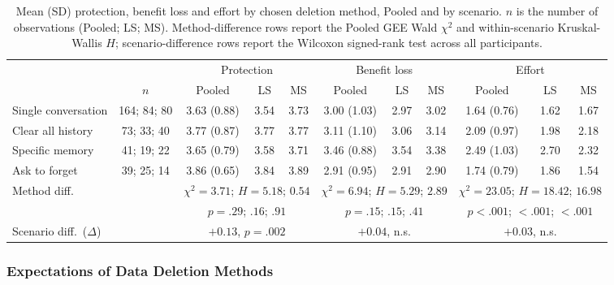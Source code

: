 \documentclass[conference,compsoc]{IEEEtran}
\begin{document}
\begin{table}[t]
\centering
\caption{Mean (SD) protection, benefit loss and effort by chosen deletion method, Pooled and by scenario. $n$ is the number of observations (Pooled; LS; MS). Method-difference rows report the Pooled GEE Wald $\chi^2$ and within-scenario Kruskal-Wallis $H$; scenario-difference rows report the Wilcoxon signed-rank test across all participants.}
\label{tab:method-scales}
\small
\setlength{\tabcolsep}{4pt}
\begin{tabular}{lcccccccccc}
\toprule
 & & \multicolumn{3}{c}{Protection} & \multicolumn{3}{c}{Benefit loss} & \multicolumn{3}{c}{Effort} \\
\cmidrule(lr){3-5}\cmidrule(lr){6-8}\cmidrule(lr){9-11}
 & $n$ & Pooled & LS & MS & Pooled & LS & MS & Pooled & LS & MS \\
\midrule
Single conversation & 164; 84; 80 & 3.63 (0.88) & 3.54 & 3.73 & 3.00 (1.03) & 2.97 & 3.02 & 1.64 (0.76) & 1.62 & 1.67 \\
Clear all history & 73; 33; 40 & 3.77 (0.87) & 3.77 & 3.77 & 3.11 (1.10) & 3.06 & 3.14 & 2.09 (0.97) & 1.98 & 2.18 \\
Specific memory & 41; 19; 22 & 3.65 (0.79) & 3.58 & 3.71 & 3.46 (0.88) & 3.54 & 3.38 & 2.49 (1.03) & 2.70 & 2.32 \\
Ask to forget & 39; 25; 14 & 3.86 (0.65) & 3.84 & 3.89 & 2.91 (0.95) & 2.91 & 2.90 & 1.74 (0.79) & 1.86 & 1.54 \\
\midrule
\multicolumn{2}{l}{Method diff.}
  & \multicolumn{3}{c}{$\chi^2\!=\!3.71$; $H\!=\!5.18$; $0.54$}
  & \multicolumn{3}{c}{$\chi^2\!=\!6.94$; $H\!=\!5.29$; $2.89$}
  & \multicolumn{3}{c}{$\chi^2\!=\!23.05$; $H\!=\!18.42$; $16.98$} \\
\multicolumn{2}{l}{}
  & \multicolumn{3}{c}{$p\!=\!.29$; $.16$; $.91$}
  & \multicolumn{3}{c}{$p\!=\!.15$; $.15$; $.41$}
  & \multicolumn{3}{c}{$p\!<\!.001$; $<\!.001$; $<\!.001$} \\
\multicolumn{2}{l}{Scenario diff.\ ($\Delta$)}
  & \multicolumn{3}{c}{$+0.13$, $p\!=\!.002$}
  & \multicolumn{3}{c}{$+0.04$, n.s.}
  & \multicolumn{3}{c}{$+0.03$, n.s.} \\
\bottomrule
\end{tabular}
\end{table}

\subsubsection{Expectations of Data Deletion Methods}
\label{sec:expectations}
\end{document}
